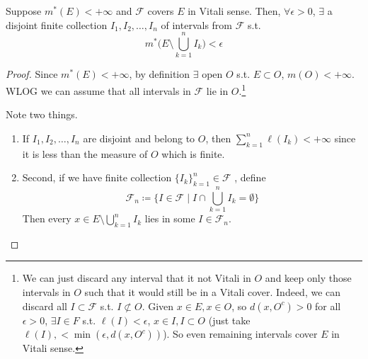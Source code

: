   \begin{lemma}
    Suppose $m^\ast (E) < +\infty$ and $\mathcal{F}$ covers $E$ in Vitali sense. Then, $\forall \epsilon > 0$, $\exists$ a disjoint finite collection $I_1, I_2, \ldots, I_n$ of intervals from $\mathcal{F}$ s.t. 
    \begin{equation}
      m^\ast \bigg( E \setminus \bigcup_{k=1}^n I_k \bigg) < \epsilon
    \end{equation}
  \end{lemma}
  \begin{proof}
    Since $m^\ast (E) < +\infty$, by definition $\exists$ open $O$ s.t. $E \subset O$, $m(O) < +\infty$. WLOG we can assume that all intervals in $\mathcal{F}$ lie in $O$.\footnote{We can just discard any interval that it not Vitali in $O$ and keep only those intervals in $O$ such that it would still be in a Vitali cover. Indeed, we can discard all $I \subset \mathcal{F}$ s.t. $I \not\subset O$. Given $x \in E, x \in O$, so $d(x, O^c) > 0$ for all $\epsilon > 0$, $\exists I \in F$ s.t. $\ell(I) < \epsilon$, $x \in I, I \subset O$ (just take $\ell(I), < \min(\epsilon, d(x, O^c))$). So even remaining intervals cover $E$ in Vitali sense. }

    Note two things. 
    \begin{enumerate}
      \item If $I_1, I_2, \ldots, I_n$ are disjoint and belong to $O$, then $\sum_{k=1}^n \ell(I_k) < +\infty$ since it is less than the measure of $O$ which is finite. 

      \item Second, if we have finite collection $\{I_k\}_{k=1}^n \in \mathcal{F}$ , define 
      \begin{equation}
        \mathcal{F}_n \coloneqq \{I \in \mathcal{F} \mid I \cap \bigcup_{k=1}^n I_k = \emptyset \}
      \end{equation}
      Then every $x \in E \setminus \bigcup_{k=1}^n I_k$ lies in some $I \in \mathcal{F}_n$. 
    \end{enumerate}


\end{proof}
